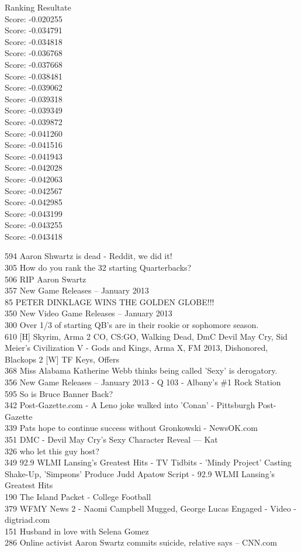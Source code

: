 \documentclass[11pt]{article}
\begin{document}
    Ranking Resultate\\
Score: -0.020255\\
Score: -0.034791\\
Score: -0.034818\\
Score: -0.036768\\
Score: -0.037668\\
Score: -0.038481\\
Score: -0.039062\\
Score: -0.039318\\
Score: -0.039349\\
Score: -0.039872\\
Score: -0.041260\\
Score: -0.041516\\
Score: -0.041943\\
Score: -0.042028\\
Score: -0.042063\\
Score: -0.042567\\
Score: -0.042985\\
Score: -0.043199\\
Score: -0.043255\\
Score: -0.043418

594 Aaron Shwartz is dead - Reddit, we did it!\\
305 How do you rank the 32 starting Quarterbacks?\\
506 RIP Aaron Swartz\\
357 New Game Releases -- January 2013\\
85 PETER DINKLAGE WINS THE GOLDEN GLOBE!!!\\
350 New Video Game Releases -- January 2013\\
300 Over 1/3 of starting QB's are in their rookie or sophomore season.\\
610 {[}H{]} Skyrim, Arma 2 CO, CS:GO, Walking Dead, DmC Devil May Cry,
Sid Meier's Civilization V - Gods and Kings, Arma X, FM 2013,
Dishonored, Blackops 2 {[}W{]} TF Keys, Offers\\
368 Miss Alabama Katherine Webb thinks being called 'Sexy' is
derogatory.\\
356 New Game Releases -- January 2013 - Q 103 - Albany's \#1 Rock
Station\\
595 So is Bruce Banner Back?\\
342 Post-Gazette.com - A Leno joke walked into 'Conan' - Pittsburgh
Post-Gazette\\
339 Pats hope to continue success without Gronkowski - NewsOK.com\\
351 DMC - Devil May Cry's Sexy Character Reveal --- Kat\\
326 who let this guy host?\\
349 92.9 WLMI Lansing's Greatest Hits - TV Tidbits - 'Mindy Project'
Casting Shake-Up, 'Simpsons' Produce Judd Apatow Script - 92.9 WLMI
Lansing's Greatest Hits\\
190 The Island Packet - College Football\\
379 WFMY News 2 - Naomi Campbell Mugged, George Lucas Engaged - Video -
digtriad.com\\
151 Husband in love with Selena Gomez\\
286 Online activist Aaron Swartz commits suicide, relative says --
CNN.com
\end{document}

